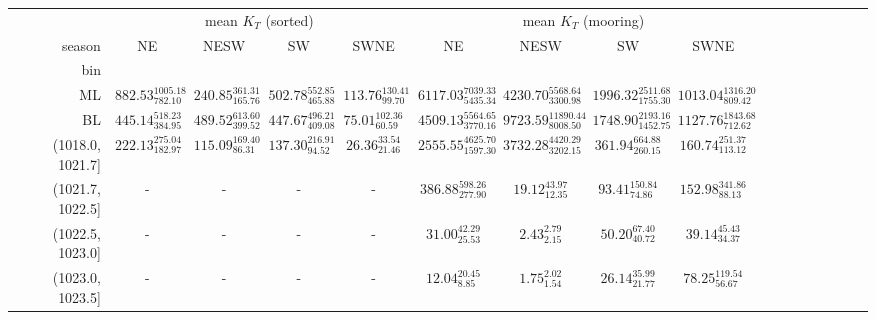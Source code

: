 \begin{tabular}{@{\extracolsep\fill}rcccccccccccccccc}
\toprule
{} & \multicolumn{4}{c}{mean $K_T$ (sorted)} & \multicolumn{4}{c}{mean $K_T$ (mooring)} \\
season &                           NE &                        NESW &                          SW &                       SWNE &                             NE &                            NESW &                             SW &                          SWNE \\
bin              &                              &                             &                             &                            &                                &                                 &                                &                               \\
\midrule
ML               &  $882.53_{782.10}^{1005.18}$ &  $240.85_{165.76}^{361.31}$ &  $502.78_{465.88}^{552.85}$ &  $113.76_{99.70}^{130.41}$ &  $6117.03_{5435.34}^{7039.33}$ &   $4230.70_{3300.98}^{5568.64}$ &  $1996.32_{1755.30}^{2511.68}$ &  $1013.04_{809.42}^{1316.20}$ \\
BL               &   $445.14_{384.95}^{518.23}$ &  $489.52_{399.52}^{613.60}$ &  $447.67_{409.08}^{496.21}$ &   $75.01_{60.59}^{102.36}$ &  $4509.13_{3770.16}^{5564.65}$ &  $9723.59_{8008.50}^{11890.44}$ &  $1748.90_{1452.75}^{2193.16}$ &  $1127.76_{712.62}^{1843.68}$ \\
(1018.0, 1021.7] &   $222.13_{182.97}^{275.04}$ &   $115.09_{86.31}^{169.40}$ &   $137.30_{94.52}^{216.91}$ &    $26.36_{21.46}^{33.54}$ &  $2555.55_{1597.30}^{4625.70}$ &   $3732.28_{3202.15}^{4420.29}$ &     $361.94_{260.15}^{664.88}$ &    $160.74_{113.12}^{251.37}$ \\
(1021.7, 1022.5] &                            - &                           - &                           - &                          - &     $386.88_{277.90}^{598.26}$ &         $19.12_{12.35}^{43.97}$ &       $93.41_{74.86}^{150.84}$ &     $152.98_{88.13}^{341.86}$ \\
(1022.5, 1023.0] &                            - &                           - &                           - &                          - &        $31.00_{25.53}^{42.29}$ &            $2.43_{2.15}^{2.79}$ &        $50.20_{40.72}^{67.40}$ &       $39.14_{34.37}^{45.43}$ \\
(1023.0, 1023.5] &                            - &                           - &                           - &                          - &         $12.04_{8.85}^{20.45}$ &            $1.75_{1.54}^{2.02}$ &        $26.14_{21.77}^{35.99}$ &      $78.25_{56.67}^{119.54}$ \\

\end{tabular}
